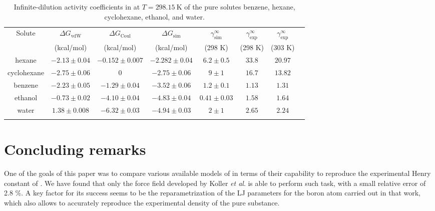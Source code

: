 \documentclass[3p,twocolumn]{elsarticle}
\begin{document}
\begin{table}
	\centering
	\caption{Infinite-dilution activity coefficients in \ce{[emim][B(CN)_4]} at $T = 298.15~\text{K}$ of the pure solutes benzene, hexane, cyclohexane, ethanol, and water.}
	\begin{adjustbox}{width=1\textwidth}
		\begin{tabular}{cccccccc}  
			\hline\hline
			Solute & $\Delta G_\text{vdW}$  & $\Delta G_\text{Coul}$  & $\Delta G_\text{sim}$  & $\gamma^\infty_\text{sim}$ & $\gamma^\infty_\text{exp}$ \cite{Doma_ska_2011} & $\gamma^\infty_\text{exp}$ \cite{Yan_2010} \\
			& (kcal/mol) & (kcal/mol) &  (kcal/mol)  & (298 K) & (298 K)  & (303 K) \\
			\hline
			hexane & $-2.13 \pm 0.04$ & $-0.152 \pm 0.007$ & $-2.282 \pm 0.04$ & $6.2 \pm 0.5$ & $33.8$ & $20.97$  \\
			cyclohexane & $-2.75 \pm 0.06$ & 0 & $-2.75 \pm 0.06$ & $9 \pm 1$ & $16.7$ & $13.82$ \\
			benzene & $-2.23 \pm 0.05$ & $-1.29 \pm 0.04$ & $-3.52 \pm 0.06$ & $1.2 \pm 0.1$ & $1.13$ & $1.31$ \\ 
			ethanol & $-0.73 \pm 0.02$ & $-4.10 \pm 0.04$ & $-4.83 \pm 0.04$ & $0.41 \pm 0.03$ & $1.58$ & $1.64$  \\
			water & $1.38 \pm 0.008$ & $-6.32 \pm 0.03$ & $-4.94 \pm 0.03$ & $2 \pm 1$ & $2.65$ & $2.24$ \\
			\hline\hline
			\label{table:gamma} 
		\end{tabular}
	\end{adjustbox}
\end{table}

\section{Concluding remarks}
\label{sec:conclusion}

One of the goals of this paper was to compare various available models of \ce{[emim][B(CN)_4]} in terms of their capability to reproduce the experimental Henry constant of .
We have found that only the force field developed by Koller \textit{et al}. \cite{Koller_2012} is able to perform such task, with a small relative error of 2.8 \%.
A key factor for its success seems to be the reparametrization of the LJ parameters for the boron atom carried out in that work, which also allows to accurately reproduce the experimental density of the pure substance.
\end{document}
